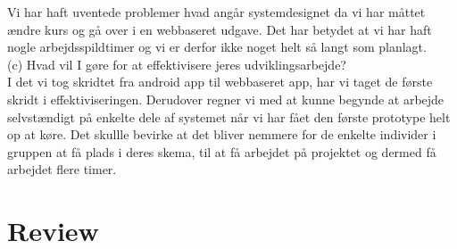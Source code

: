 \documentclass[12pt]{article}
\begin{document}
Vi har haft uventede problemer hvad angår systemdesignet da vi har måttet ændre kurs og gå over i en webbaseret udgave. Det har betydet at vi har haft nogle arbejdsspildtimer og vi er derfor ikke noget helt så langt som planlagt.\\

(c) Hvad vil I gøre for at effektivisere jeres udviklingsarbejde?\\

I det vi tog skridtet fra android app til webbaseret app, har vi taget de første skridt i effektiviseringen. Derudover regner vi med at kunne begynde at arbejde selvstændigt på enkelte dele af systemet når vi har fået den første prototype helt op at køre. Det skullle bevirke at det bliver nemmere for de enkelte individer i gruppen at få plads i deres skema, til at få arbejdet på projektet og dermed få arbejdet flere timer. 

\pagebreak
\section{Review}
\end{document}
